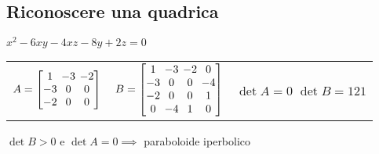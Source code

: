 \subsection{Riconoscere una quadrica}

$x^2 - 6xy - 4xz - 8y + 2z = 0$

\begin{tabularx}{\textwidth}{llX}
	$
		A = \left[
		\arraycolsep=2.0pt\def\arraystretch{1.0}
		\begin{array}{@{}ccc@{}}
			1 & -3 & -2 \\
			-3 & 0 & 0 \\
			-2 & 0 & 0 \\
		\end{array}
		\right]
	$ &
	$
		B = \left[
		\arraycolsep=2.0pt\def\arraystretch{1.0}
		\begin{array}{@{}cccc@{}}
			1 & -3 & -2 & 0 \\
			-3 & 0 & 0 & -4 \\
			-2 & 0 & 0 & 1 \\
			0 & -4 & 1 & 0
		\end{array}
		\right]
	$ &
	$\det A = 0$ \newline
	$\det B = 121$ \newline
\end{tabularx}

$\det B > 0$ e $\det A = 0 \implies$ paraboloide iperbolico
